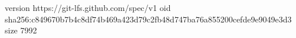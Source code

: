 version https://git-lfs.github.com/spec/v1
oid sha256:c849670b7b4c8df74b469a423d79c2fb48d747ba76a855200cefde9e9049e3d3
size 7992
